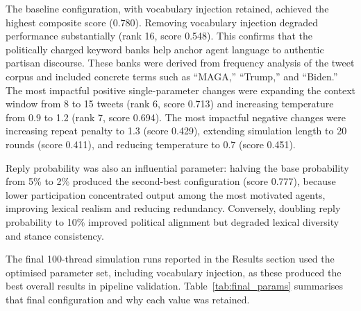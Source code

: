 \documentclass[logo,bsc,singlespacing,parskip,online]{infthesis}
\begin{document}
The baseline configuration, with vocabulary injection retained, achieved the highest composite score (0.780). Removing vocabulary injection degraded performance substantially (rank 16, score 0.548). This confirms that the politically charged keyword banks help anchor agent language to authentic partisan discourse. These banks were derived from frequency analysis of the tweet corpus and included concrete terms such as ``MAGA,'' ``Trump,'' and ``Biden.'' The most impactful positive single-parameter changes were expanding the context window from 8 to 15 tweets (rank 6, score 0.713) and increasing temperature from 0.9 to 1.2 (rank 7, score 0.694). The most impactful negative changes were increasing repeat penalty to 1.3 (score 0.429), extending simulation length to 20 rounds (score 0.411), and reducing temperature to 0.7 (score 0.451).

Reply probability was also an influential parameter: halving the base probability from 5\% to 2\% produced the second-best configuration (score 0.777), because lower participation concentrated output among the most motivated agents, improving lexical realism and reducing redundancy. Conversely, doubling reply probability to 10\% improved political alignment but degraded lexical diversity and stance consistency.

The final 100-thread simulation runs reported in the Results section used the optimised parameter set, including vocabulary injection, as these produced the best overall results in pipeline validation. Table~\ref{tab:final_params} summarises that final configuration and why each value was retained.
\end{document}
